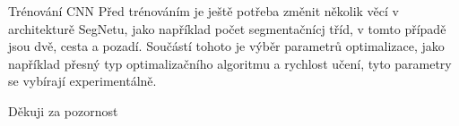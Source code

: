 \documentclass[aspectratio=1610]{beamer}
\begin{document}
\begin{frame}{Trénování CNN}
Před trénováním je ještě potřeba změnit několik věcí v architekturě SegNetu, jako například počet segmentačnícj tříd, v tomto případě jsou dvě, cesta a pozadí. Součástí tohoto je výběr parametrů optimalizace, jako například přesný typ optimalizačního algoritmu a rychlost učení, tyto parametry se vybírají experimentálně.  
\end{frame}
\begin{frame}{}
	\centering
	{\Large Děkuji za pozornost}	
\end{frame}
\end{document}
